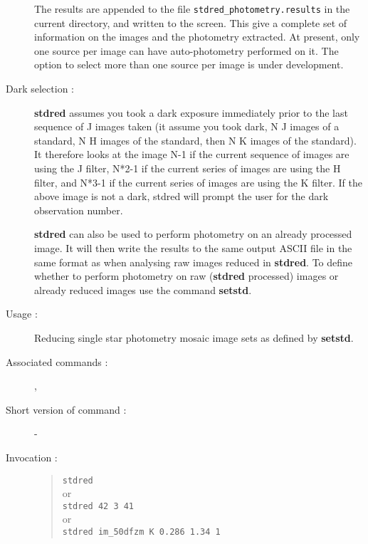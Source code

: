 \begin{description}
\begin{enumerate}
\end{enumerate}

The results are appended to the file {\tt stdred\_photometry.results}
in the current directory, and written to the screen.  This give a
complete set of information on the images and the photometry
extracted.  At present, only one source per image can have
auto-photometry performed on it.  The option to select more than one
source per image is under development.

\item[Dark selection :] {\bf stdred} assumes you took a dark exposure
immediately prior to the last sequence of J images taken (it assume you
took dark, N J images of a standard, N H images of the standard, then N
K images of the standard).  It therefore looks at the image N-1 if the
current sequence of images are using the J filter, N*2-1 if the current
series of images are using the H filter, and N*3-1 if the current
series of images are using the K filter.  If the above image is not a
dark, stdred will prompt the user for the dark observation number.

{\bf stdred}  can also be used to perform photometry on an already processed
image. It will then write the results to the same output ASCII file in
the same format as when analysing raw images reduced in {\bf stdred}.  To
define whether to perform photometry on raw ({\bf stdred} processed) images or
already reduced images use the command {\bf setstd}.

\item[Usage :] Reducing single star photometry mosaic image sets as
defined by {\bf setstd}.

\item[Associated commands :] {\tt {}}, 
{\tt {}}

\item[Short version of command :] -
\item[Invocation :]

\begin{quote}{\tt  stdred }\\
or \\
{\tt stdred 42 3 41 } \\
or \\
{\tt stdred im\_50dfzm K 0.286 1.34 1}
\end{quote}

\begin{itemize}


\end{itemize}
\end{description}

